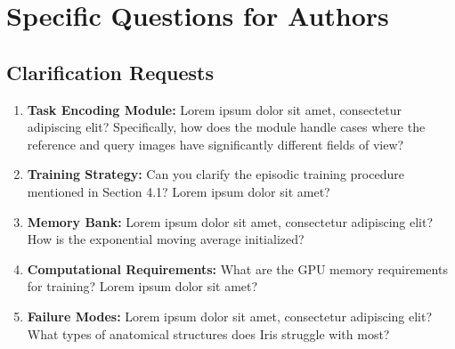 \section*{Specific Questions for Authors}
\label{sec:questions_authors}

\subsection{Clarification Requests}
\begin{enumerate}
    \item \textbf{Task Encoding Module:} Lorem ipsum dolor sit amet, consectetur adipiscing elit? Specifically, how does the module handle cases where the reference and query images have significantly different fields of view?
    
    \item \textbf{Training Strategy:} Can you clarify the episodic training procedure mentioned in Section 4.1? Lorem ipsum dolor sit amet?
    
    \item \textbf{Memory Bank:} Lorem ipsum dolor sit amet, consectetur adipiscing elit? How is the exponential moving average initialized?
    
    \item \textbf{Computational Requirements:} What are the GPU memory requirements for training? Lorem ipsum dolor sit amet?
    
    \item \textbf{Failure Modes:} Lorem ipsum dolor sit amet, consectetur adipiscing elit? What types of anatomical structures does Iris struggle with most?
\end{enumerate}

